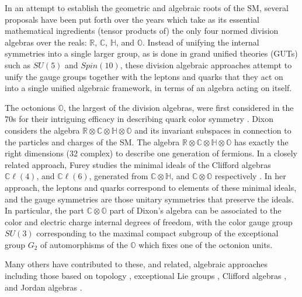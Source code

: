 \documentclass{article}
\newcommand{\bb}[1]{\mathbb{#1}}
\begin{document}
In an attempt to establish the geometric and algebraic roots of the SM, several proposals have been put forth over the years which take as its essential mathematical ingredients (tensor products of) the only four normed division algebras over the reals: $\bb{R}$, $\bb{C}$, $\bb{H}$, and $\bb{O}$. Instead of unifying the internal symmetries into a single larger group, as is done in grand unified theories (GUTs) such as $SU(5)$ and $Spin(10)$, these division algebraic approaches attempt to unify the gauge groups together with the leptons and quarks that they act on into a single unified algebraic framework, in terms of an algebra acting on itself.

The octonions $\bb{O}$, the largest of the division algebras, were first considered in the $70$s for their intriguing efficacy in describing quark color symmetry \cite{gunaydin1973quark}. Dixon \cite{dixon1990derivation,dixon2004division,dixon2013division} considers the algebra $\bb{R}\otimes\bb{C}\otimes\bb{H}\otimes\bb{O}$ and its invariant subspaces in connection to the particles and charges of the SM. The algebra $\bb{R}\otimes\bb{C}\otimes\bb{H}\otimes\bb{O}$ has exactly the right dimensions (32 complex) to describe one generation of fermions. In a closely related approach, Furey studies the minimal ideals of the Clifford algebras $\bb{C}\ell(4)$, and $\bb{C}\ell(6)$, generated from $\bb{C}\otimes\bb{H}$, and $\bb{C}\otimes\bb{O}$ respectively \cite{furey2016standard,furey20183}. In her approach, the leptons and quarks correspond to elements of these minimal ideals, and the gauge symmetries are those unitary symmetries that preserve the ideals. In particular, the part $\bb{C}\otimes\bb{O}$ part of Dixon's algebra can be associated to the color and electric charge internal degrees of freedom, with the color gauge group $SU(3)$ corresponding to the maximal compact subgroup of the exceptional group $G_2$ of automorphisms of the $\bb{O}$ which ﬁxes one of the octonion units.

Many others have contributed to these, and related, algebraic approaches including those based on topology \cite{gresnigt2018braids,gresnigt2019braided,gresnigt2020topological,gresnigt2021topological,gresnigt2021braided}, exceptional Lie groups \cite{manogue2010octonions,wilson2022octonionic,manogue2022octions,wilson2022chirality,raj2022lagrangian,kaushik2022e_8}, Clifford algebras \cite{trayling1999geometric,trayling2001geometric,trayling2004cl,stoica2017standard,stoica2020chiral,todorov2022octonionic, perelman2019c,perelman2019r,pavvsivc2013geometric}, and Jordan algebras \cite{dubois2016exceptional,dubois2019exceptional,todorov2018octonions,todorov2018deducing,boyle2020standard,boyle2020standard2}. 
\end{document}
